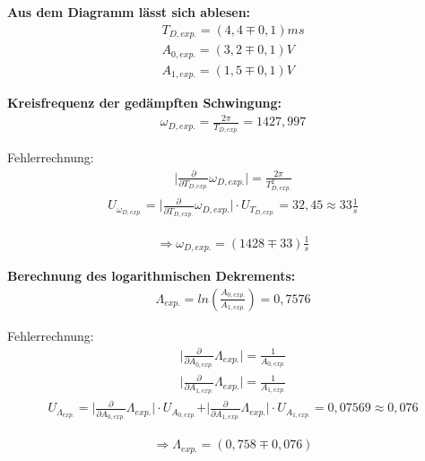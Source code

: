 \documentclass[a4paper]{scrartcl}
\numberwithin{equation}{subsection}
\begin{document}
\textbf{Aus dem Diagramm lässt sich ablesen:}
\begin{align*}
T_{D,\textit{exp.}} = (4,4\mp0,1)ms \\
A_{0,\textit{exp.}} = (3,2\mp0,1)V \\
A_{1,\textit{exp.}} = (1,5\mp0,1)V
\end{align*}

\textbf{Kreisfrequenz der gedämpften Schwingung:}
\begin{align}
\omega_{D,\textit{exp.}} = \frac{2\pi}{T_{D,\textit{exp.}}} = 1427,997
\end{align}

Fehlerrechnung:
\begin{align*}
\vert \frac{\partial}{\partial T_{D,\textit{exp.}}}\omega_{D,\textit{exp.}}\vert = \frac{2\pi}{T_{D,\textit{exp.}}^2}
\end{align*}
\begin{align*}
U_{\omega_{D,\textit{exp.}}} = \vert \frac{\partial}{\partial T_{D,\textit{exp.}}}\omega_{D,\textit{exp.}}\vert \cdot U_{T_{D,\textit{exp.}}} = 32,45 \approx 33 \frac{1}{s} 
\end{align*}

\begin{align*}
\Rightarrow \omega_{D,\textit{exp.}} = (1428 \mp 33) \frac{1}{s}
\end{align*}

\textbf{Berechnung des logarithmischen Dekrements:}
\begin{align}
\Lambda_{\textit{exp.}} = ln(\frac{A_{0,\textit{exp.}}}{A_{1,\textit{exp.}}}) = 0,7576
\end{align}

Fehlerrechnung:
\begin{align*}
\vert \frac{\partial}{\partial A_{0,\textit{exp.}}}\Lambda_{\textit{exp.}}\vert = \frac{1}{A_{0,\textit{exp.}}} \\
\vert \frac{\partial}{\partial A_{1,\textit{exp.}}}\Lambda_{\textit{exp.}}\vert = \frac{1}{A_{1,\textit{exp.}}}
\end{align*}
\begin{align*}
U_{\Lambda_{\textit{exp.}}} = \vert \frac{\partial}{\partial A_{0,\textit{exp.}}}\Lambda_{\textit{exp.}}\vert \cdot U_{A_{0,\textit{exp.}}} + \vert \frac{\partial}{\partial A_{1,\textit{exp.}}}\Lambda_{\textit{exp.}}\vert \cdot U_{A_{1,\textit{exp.}}} = 0,07569 \approx 0,076 
\end{align*}

\begin{align*}
\Rightarrow \Lambda_{\textit{exp.}} = (0,758 \mp 0,076)
\end{align*}
\end{document}
